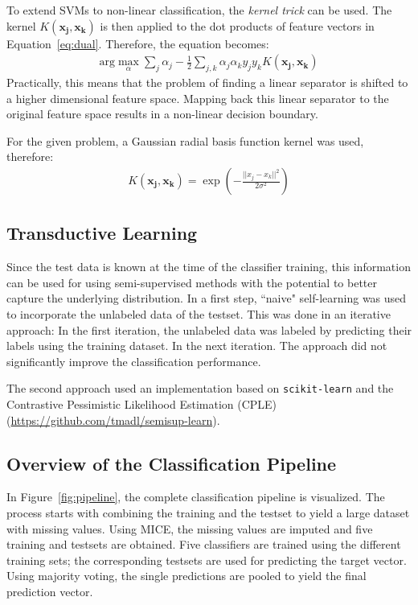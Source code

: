 \documentclass[a4paper]{article}
\begin{document}
To extend SVMs to non-linear classification, the \emph{kernel trick}
can be used. The kernel $K(\mathbf{x_j}, \mathbf{x_k})$ is then applied to the dot products of feature vectors in Equation~\ref{eq:dual}. Therefore, the equation becomes:
\begin{align}
\label{eq:dualkernel}
\text{arg}\max_\alpha\sum_j\alpha_j - \frac{1}{2}\sum_{j,k}\alpha_j\alpha_ky_jy_kK(\mathbf{x_j}, \mathbf{x_k})
\end{align} 
Practically, this means that the problem of finding a linear separator is shifted to a higher dimensional feature space. Mapping back this linear separator to the original feature space results in a non-linear decision boundary. 

For the given problem, a Gaussian radial basis function kernel was used, therefore:
\begin{align}
K(\mathbf{x_j}, \mathbf{x_k}) = \exp(-\frac{||x_j - x_k ||^2}{2\sigma^2})
\end{align}


\subsection{Transductive Learning}

Since the test data is known at the time of the classifier training,
this information can be used for using semi-supervised methods with
the potential to better capture the underlying distribution. In a
first step, ``naive" self-learning was used to incorporate the
unlabeled data of the testset. This was done in an iterative approach:
In the first iteration, the unlabeled data was labeled by predicting
their labels using the training dataset. In the next iteration. The
approach did not significantly improve the classification performance.

The second approach used an implementation based on
\texttt{scikit-learn} and the Contrastive Pessimistic Likelihood
Estimation (CPLE) (\url{https://github.com/tmadl/semisup-learn}).



\subsection{Overview of the Classification Pipeline}

In Figure~\ref{fig:pipeline}, the complete classification pipeline is visualized. The process starts with combining the training and the testset to yield a large dataset with missing values. Using MICE, the missing values are imputed and five training and testsets are obtained. Five classifiers are trained using the different training sets; the corresponding testsets are used for predicting the target vector. Using majority voting, the single predictions are pooled to yield the final prediction vector.
\end{document}
